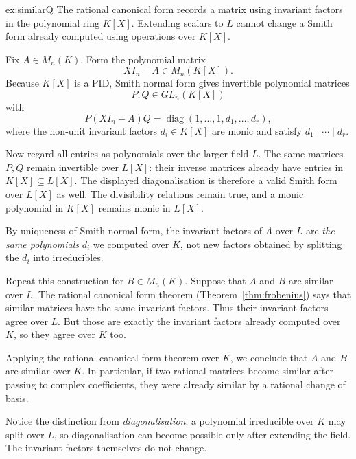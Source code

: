 \begin{solution}{ex:similarQ}
\idea The rational canonical form records a matrix using invariant factors in the polynomial ring $K[X]$. Extending scalars to $L$ cannot change a Smith form already computed using operations over $K[X]$.

\writeup Fix $A\in M_n(K)$. Form the polynomial matrix
\[
X I_n-A\in M_n(K[X]).
\]
Because $K[X]$ is a PID, Smith normal form gives invertible polynomial matrices
\[
P,Q\in GL_n(K[X])
\]
with
\[
P(XI_n-A)Q
=\operatorname{diag}(1,\ldots,1,d_1,\ldots,d_r),
\]
where the non-unit invariant factors $d_i\in K[X]$ are monic and satisfy $d_1\mid\cdots\mid d_r$.

Now regard all entries as polynomials over the larger field $L$. The same matrices $P,Q$ remain invertible over $L[X]$: their inverse matrices already have entries in $K[X]\subseteq L[X]$. The displayed diagonalisation is therefore a valid Smith form over $L[X]$ as well. The divisibility relations remain true, and a monic polynomial in $K[X]$ remains monic in $L[X]$.

By uniqueness of Smith normal form, the invariant factors of $A$ over $L$ are \emph{the same polynomials} $d_i$ we computed over $K$, not new factors obtained by splitting the $d_i$ into irreducibles.

Repeat this construction for $B\in M_n(K)$. Suppose that $A$ and $B$ are similar over $L$. The rational canonical form theorem (Theorem~\ref{thm:frobenius}) says that similar matrices have the same invariant factors. Thus their invariant factors agree over $L$. But those are exactly the invariant factors already computed over $K$, so they agree over $K$ too.

Applying the rational canonical form theorem over $K$, we conclude that $A$ and $B$ are similar over $K$. In particular, if two rational matrices become similar after passing to complex coefficients, they were already similar by a rational change of basis.

Notice the distinction from \emph{diagonalisation}: a polynomial irreducible over $K$ may split over $L$, so diagonalisation can become possible only after extending the field. The invariant factors themselves do not change.
\end{solution}

